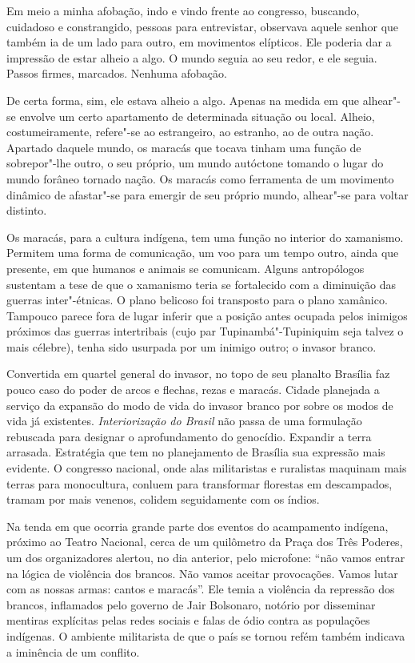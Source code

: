 Em meio a minha afobação, indo e vindo frente ao congresso, buscando,
cuidadoso e constrangido, pessoas para entrevistar, observava aquele
senhor que também ia de um lado para outro, em movimentos elípticos. Ele
poderia dar a impressão de estar alheio a algo. O mundo seguia ao seu
redor, e ele seguia. Passos firmes, marcados. Nenhuma afobação.

De certa forma, sim, ele estava alheio a algo. Apenas na medida em que
alhear"-se envolve um certo apartamento de determinada situação ou local.
Alheio, costumeiramente, refere"-se ao estrangeiro, ao estranho, ao de
outra nação. Apartado daquele mundo, os maracás que tocava tinham uma
função de sobrepor"-lhe outro, o seu próprio, um mundo autóctone tomando
o lugar do mundo forâneo tornado nação. Os maracás como ferramenta de um
movimento dinâmico de afastar"-se para emergir de seu próprio mundo,
alhear"-se para voltar distinto.

Os maracás, para a cultura indígena, tem uma função no interior do
xamanismo. Permitem uma forma de comunicação, um voo para um tempo
outro, ainda que presente, em que humanos e animais se comunicam. Alguns
antropólogos sustentam a tese de que o xamanismo teria se fortalecido
com a diminuição das guerras inter"-étnicas. O plano belicoso foi
transposto para o plano xamânico. Tampouco parece fora de lugar inferir
que a posição antes ocupada pelos inimigos próximos das guerras
intertribais (cujo par Tupinambá"-Tupiniquim seja talvez o mais célebre),
tenha sido usurpada por um inimigo outro; o invasor branco.

Convertida em quartel general do invasor, no topo de seu planalto
Brasília faz pouco caso do poder de arcos e flechas, rezas e maracás.
Cidade planejada a serviço da expansão do modo de vida do invasor branco
por sobre os modos de vida já existentes. \emph{Interiorização do
Brasil} não passa de uma formulação rebuscada para designar o
aprofundamento do genocídio. Expandir a terra arrasada. Estratégia que
tem no planejamento de Brasília sua expressão mais evidente. O congresso
nacional, onde alas militaristas e ruralistas maquinam mais terras para
monocultura, conluem para transformar florestas em descampados, tramam
por mais venenos, colidem seguidamente com os índios.

Na tenda em que ocorria grande parte dos eventos do acampamento
indígena, próximo ao Teatro Nacional, cerca de um quilômetro da Praça
dos Três Poderes, um dos organizadores alertou, no dia anterior, pelo
microfone: ``não vamos entrar na lógica de violência dos brancos. Não
vamos aceitar provocações. Vamos lutar com as nossas armas: cantos e
maracás''. Ele temia a violência da repressão dos brancos, inflamados
pelo governo de Jair Bolsonaro, notório por disseminar mentiras
explícitas pelas redes sociais e falas de ódio contra as populações
indígenas. O ambiente militarista de que o país se tornou refém também
indicava a iminência de um conflito.


